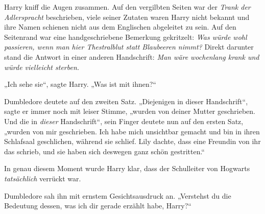 Harry kniff die Augen zusammen. Auf den vergilbten Seiten war der \emph{Trank der Adlerspracht} beschrieben, viele seiner Zutaten waren Harry nicht bekannt und ihre Namen schienen nicht aus dem Englischen abgeleitet zu sein. Auf den Seitenrand war eine handgeschriebene Bemerkung gekritzelt: \emph{Was würde wohl passieren, wenn man hier Thestralblut statt Blaubeeren nimmt?} Direkt darunter stand die Antwort in einer anderen Handschrift: \emph{Man wäre wochenlang krank und würde vielleicht sterben.}

„Ich sehe sie“, sagte Harry. „Was ist mit ihnen?“

Dumbledore deutete auf den zweiten Satz. „Diejenigen in dieser Handschrift“, sagte er immer noch mit leiser Stimme, „wurden von deiner Mutter geschrieben. Und die in \emph{dieser} Handschrift“, sein Finger deutete nun auf den ersten Satz, „wurden von mir geschrieben. Ich habe mich unsichtbar gemacht und bin in ihren Schlafsaal geschlichen, während sie schlief. Lily dachte, dass eine Freundin von ihr das schrieb, und sie haben sich deswegen ganz schön gestritten.“

In genau diesem Moment wurde Harry klar, dass der Schulleiter von Hogwarts \emph{tatsächlich} verrückt war.

Dumbledore sah ihn mit ernstem Gesichtsausdruck an. „Verstehst du die Bedeutung dessen, was ich dir gerade erzählt habe, Harry?“

